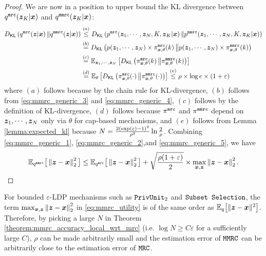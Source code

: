 \begin{proof}
We are now in a position to upper bound the KL divergence between $q^{\texttt{mrc}}({\boldsymbol{z}}_K | {\boldsymbol{x}})$ and $q^{\texttt{mmrc}}({\boldsymbol{z}}_K | {\boldsymbol{x}})$:
\begin{align}
 {D}_{\mathsf{KL}}\left( q^{\texttt{mrc}}({\boldsymbol{z}} | {\boldsymbol{x}})\, \middle\Vert q^{\texttt{mmrc}}({\boldsymbol{z}} | {\boldsymbol{x}}) \right) &  \stackrel{(a)}{\leq}  {D}_{\mathsf{KL}}\left( p^{\texttt{mrc}}({\boldsymbol{z}}_1, \cdots, {\boldsymbol{z}}_N, K, {\boldsymbol{z}}_K | {\boldsymbol{x}})\, \middle\Vert p^{\texttt{mmrc}}({\boldsymbol{z}}_1, \cdots, {\boldsymbol{z}}_N, K, {\boldsymbol{z}}_K | {\boldsymbol{x}}) \right)\\
 &  \stackrel{(b)}{=}   {D}_{\mathsf{KL}}\left( p({\boldsymbol{z}}_1, \cdots, {\boldsymbol{z}}_N) \times \pi^{\texttt{mrc}}_{{\boldsymbol{x}}, \theta}(k)\, \middle\Vert p({\boldsymbol{z}}_1, \cdots, {\boldsymbol{z}}_N) \times \pi^{\texttt{mmrc}}_{{\boldsymbol{x}}, \theta}(k) \right)\\
 &  \stackrel{(c)}{=} \mathbb{E}_{{\boldsymbol{z}}_1, \cdots, {\boldsymbol{z}}_N} \left[{D}_{\mathsf{KL}}\left( \pi^{\texttt{mrc}}_{{\boldsymbol{x}}, \theta}(k)\, \middle\Vert \pi^{\texttt{mmrc}}_{{\boldsymbol{x}}, \theta}(k) \right)\right] \\
 &  \stackrel{(d)}{=}\mathbb{E}_{\theta}\left[{D}_{\mathsf{KL}}\left( \pi^{\texttt{mrc}}_{{\boldsymbol{x}}, \theta}(\cdot)\, \middle\Vert \pi^{\texttt{mmrc}}_{{\boldsymbol{x}}, \theta}(\cdot) \right)\right]  \stackrel{(e)}{\leq} \rho \times \log e \times (1+\varepsilon) \label{eq:mmrc_generic_5}
\end{align}
where $(a)$ follows because by the chain rule for KL-divergence, $(b)$ follows from \eqref{eq:mmrc_generic_3} and \eqref{eq:mmrc_generic_4}, $(c)$ follows by the definition of KL-divergence, $(d)$ follows because $\pi^{\texttt{mrc}}$ and $\pi^{\texttt{mmrc}}$ depend on ${\boldsymbol{z}}_1, \cdots, {\boldsymbol{z}}_N$ only via $\theta$ for cap-based mechanisms, and $(e)$ follows from Lemma \ref{lemma:expected_kl} because $N = \frac{2\left(\exp(\varepsilon)-1\right)^2}{\rho^2}  \ln\frac{2}{\rho}  $. Combining \eqref{eq:mmrc_generic_1}, \eqref{eq:mmrc_generic_2},and \eqref{eq:mmrc_generic_5}, we have 
\begin{align}
    \mathbb{E}_{q^{\texttt{mmrc}}} \big[ \left\lVert  {\boldsymbol{z}} - {\boldsymbol{x}} \right\rVert^2_2  \big]  \leq \mathbb{E}_{q^{\texttt{mrc}}} \big[ \left\lVert  {\boldsymbol{z}} - {\boldsymbol{x}} \right\rVert^2_2  \big]  + \sqrt{\frac{\rho (1+\varepsilon)}{2}} \times \max_{{\boldsymbol{x}}, {\boldsymbol{z}}} \left\lVert  {\boldsymbol{z}} - {\boldsymbol{x}} \right\rVert^2_2. \label{eq:mrc_mmrc_relation}
\end{align}
\end{proof}

\begin{remark}\label{rmk:error_max}
For bounded $\varepsilon$-LDP mechanisms such as \emph{$\texttt{PrivUnit}_2$} and \emph{$\texttt{Subset Selection}$}, the term $\max_{{\boldsymbol{x}}, {\boldsymbol{z}}} \left\lVert  {\boldsymbol{z}} - {\boldsymbol{x}} \right\rVert^2_2$ in \eqref{eq:mmrc_utility} is of the same order as $\mathbb{E}_{q}\big[\|{\boldsymbol{z}} - {\boldsymbol{x}}\|^2\big]$. Therefore, by picking a large $N$ in Theorem \ref{theorem:mmrc_accuracy_local_wrt_mrc} (i.e. $\log N \geq C \varepsilon$ for a sufficiently large $C$), $\rho$ can be made arbitrarily small and the estimation error of \emph{$\texttt{MMRC}$} can be arbitrarily close to the estimation error of \emph{$\texttt{MRC}$}.
\end{remark}

